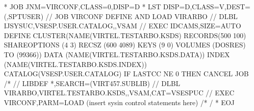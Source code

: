 \documentclass[letterpaper,10pt,english]{sphinxmanual}
\begin{document}
\begin{sphinxVerbatim}[commandchars=\\\{\}]
* \PYGZdl{}\PYGZdl{} JOB JNM=VIRCONF,CLASS=0,DISP=D
* \PYGZdl{}\PYGZdl{} LST DISP=D,CLASS=V,DEST=(,SPTUSER)
// JOB VIRCONF DEFINE AND LOAD VIRARBO
// DLBL IJSYSUC,\PYGZsq{}VSESP.USER.CATALOG\PYGZsq{},,VSAM
// EXEC IDCAMS,SIZE=AUTO
        DEFINE CLUSTER(NAME(VIRTEL.TESTARBO.KSDS) \PYGZhy{}
              RECORDS(500 100) SHAREOPTIONS (4 3) \PYGZhy{}
              RECSZ (600 4089) KEYS (9 0) \PYGZhy{}
              VOLUMES (DOSRES) TO (99366))\PYGZhy{}
        DATA (NAME(VIRTEL.TESTARBO.KSDS.DATA)) \PYGZhy{}
        INDEX (NAME(VIRTEL.TESTARBO.KSDS.INDEX)) \PYGZhy{}
              CATALOG(VSESP.USER.CATALOG)
IF LASTCC NE 0 THEN CANCEL JOB
/*
// LIBDEF *,SEARCH=(VIRT457.SUBLIB)
// DLBL VIRARBO,\PYGZsq{}VIRTEL.TESTARBO.KSDS\PYGZsq{},,VSAM,CAT=VSESPUC
// EXEC VIRCONF,PARM=\PYGZsq{}LOAD\PYGZsq{}
        (insert sysin control statements here)
/*
/\PYGZam{}
* \PYGZdl{}\PYGZdl{} EOJ
\end{sphinxVerbatim}

\end{document}
